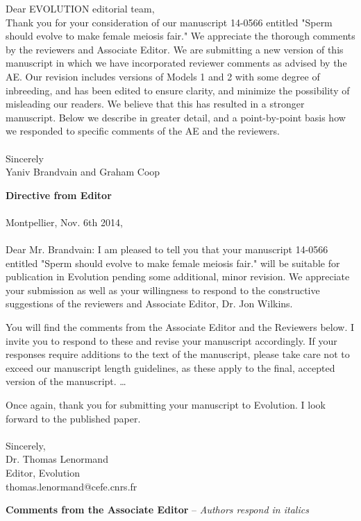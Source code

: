 \documentclass[12pt,letterpaper]{article}
\begin{document}
Dear EVOLUTION editorial team,
\\

Thank you for your consideration of our manuscript 14-0566 entitled "Sperm should evolve to make female meiosis fair." We appreciate the thorough comments by the reviewers and Associate Editor.
We are submitting a new version of this manuscript in which we have incorporated reviewer comments as advised by the AE. Our revision includes versions of Models 1 and 2 with some degree of inbreeding, and has been edited to ensure clarity, and minimize the possibility of misleading our readers. We believe that this has resulted in a stronger manuscript. Below we describe in greater detail, and a point-by-point basis how we responded to specific comments of the AE and the reviewers.
\\
\\
Sincerely \\
Yaniv Brandvain and Graham Coop
\newpage


{\bf{Directive from Editor}} \\ \\
Montpellier, Nov. 6th 2014,
\\ \\
Dear Mr. Brandvain: 
I am pleased to tell you that your manuscript 14-0566 entitled "Sperm should evolve to make female meiosis fair." will be suitable for publication in Evolution pending some additional, minor revision. We appreciate your submission as well as your willingness to respond to the constructive suggestions of the reviewers and Associate Editor, Dr. Jon Wilkins.

You will find the comments from the Associate Editor and the Reviewers below. I invite you to respond to these and revise your manuscript accordingly. If your responses require additions to the text of the manuscript, please take care not to exceed our manuscript length guidelines, as these apply to the final, accepted version of the manuscript. \dots{}

Once again, thank you for submitting your manuscript to Evolution.  I look forward to the published paper.
\\  \\
Sincerely, \\
Dr. Thomas Lenormand \\
Editor, Evolution \\
thomas.lenormand@cefe.cnrs.fr

\newpage

{\bf{Comments from the Associate Editor}} -- \emph{Authors respond in italics}  \\ 
\end{document}
